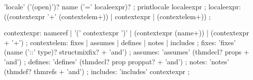 
\begin{rail}
  'locale' ('(open)')? name ('=' localeexpr)?
  ;
  printlocale localeexpr
  ;
  localeexpr: ((contextexpr '+' (contextelem+)) | contextexpr | (contextelem+))
  ;

  contextexpr: nameref | '(' contextexpr ')' |
  (contextexpr (name+)) | (contextexpr + '+')
  ;
  contextelem: fixes | assumes | defines | notes | includes
  ;
  fixes: 'fixes' (name ('::' type)? structmixfix? + 'and')
  ;
  assumes: 'assumes' (thmdecl? props + 'and')
  ;
  defines: 'defines' (thmdecl? prop proppat? + 'and')
  ;
  notes: 'notes' (thmdef? thmrefs + 'and')
  ;
  includes: 'includes' contextexpr
  ;
\end{rail}


